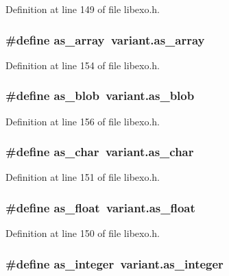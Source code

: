 Definition at line 149 of file libexo.h.
\subsubsection[{as\_\-array}]{\setlength{\rightskip}{0pt plus 5cm}\#define as\_\-array~variant.as\_\-array}\label{libexo_8h_d9a01231acf056987b8bf3c850ca890b}




Definition at line 154 of file libexo.h.
\subsubsection[{as\_\-blob}]{\setlength{\rightskip}{0pt plus 5cm}\#define as\_\-blob~variant.as\_\-blob}\label{libexo_8h_2d4ff1599bdcd12362e8b24790e1402f}




Definition at line 156 of file libexo.h.
\subsubsection[{as\_\-char}]{\setlength{\rightskip}{0pt plus 5cm}\#define as\_\-char~variant.as\_\-char}\label{libexo_8h_1c7fae8968e12ff600821a5ac0ee3fd4}




Definition at line 151 of file libexo.h.
\subsubsection[{as\_\-float}]{\setlength{\rightskip}{0pt plus 5cm}\#define as\_\-float~variant.as\_\-float}\label{libexo_8h_30357be739c7782e699fe1aa3d3d28c6}




Definition at line 150 of file libexo.h.
\subsubsection[{as\_\-integer}]{\setlength{\rightskip}{0pt plus 5cm}\#define as\_\-integer~variant.as\_\-integer}\label{libexo_8h_d8b7191fe4a561e41a9659a91c7a150a}




